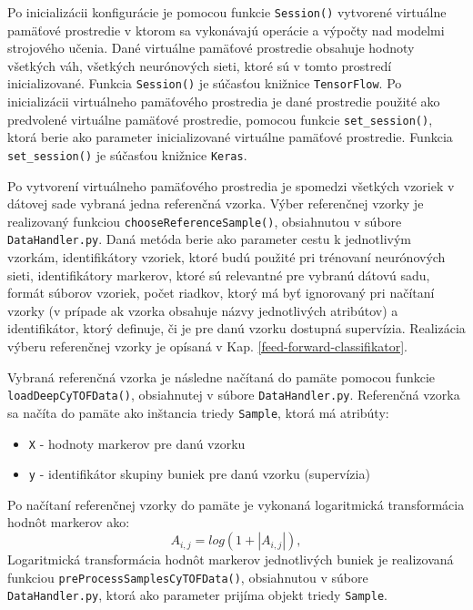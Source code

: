 Po inicializácii konfigurácie je pomocou funkcie \texttt{Session()} vytvorené virtuálne pamäťové prostredie v ktorom sa vykonávajú operácie a výpočty nad modelmi strojového učenia. Dané virtuálne pamäťové prostredie obsahuje hodnoty všetkých váh, všetkých neurónových sieti, ktoré sú v tomto prostredí inicializované. Funkcia \texttt{Session()} je súčasťou knižnice \texttt{TensorFlow}. Po inicializácii virtuálneho pamäťového prostredia je dané prostredie použité ako predvolené virtuálne pamäťové prostredie, pomocou funkcie \texttt{set_session()}, ktorá berie ako parameter inicializované virtuálne pamäťové prostredie. Funkcia \texttt{set_session()} je súčasťou knižnice \texttt{Keras}.

Po vytvorení virtuálneho pamäťového prostredia je spomedzi všetkých vzoriek v dátovej sade vybraná jedna referenčná vzorka. Výber referenčnej vzorky je realizovaný funkciou \texttt{chooseReferenceSample()}, obsiahnutou v súbore \texttt{DataHandler.py}. Daná metóda berie ako parameter cestu k jednotlivým vzorkám, identifikátory vzoriek, ktoré budú použité pri trénovaní neurónových sieti, identifikátory markerov, ktoré sú relevantné pre vybranú dátovú sadu, formát súborov vzoriek, počet riadkov, ktorý má byť ignorovaný pri načítaní vzorky (v prípade ak vzorka obsahuje názvy jednotlivých atribútov) a identifikátor, ktorý definuje, či je pre danú vzorku dostupná supervízia. Realizácia výberu referenčnej vzorky je opísaná v Kap. \ref{feed-forward-classifikator}.

\begin{sloppypar}
Vybraná referenčná vzorka je následne načítaná do pamäte pomocou funkcie \texttt{loadDeepCyTOFData()}, obsiahnutej v súbore \texttt{DataHandler.py}. Referenčná vzorka sa načíta do pamäte ako inštancia triedy \texttt{Sample}, ktorá má atribúty:
\begin{itemize}
    \item \texttt{X} - hodnoty markerov pre danú vzorku
    \item \texttt{y} - identifikátor skupiny buniek pre danú vzorku (supervízia)
\end{itemize}

Po načítaní referenčnej vzorky do pamäte je vykonaná logaritmická transformácia hodnôt markerov ako:
\begin{equation}
\label{log_transf}
    A_{i,j} = log(1+|A_{i,j}|),
\end{equation}
Logaritmická transformácia hodnôt markerov jednotlivých buniek je realizovaná funkciou \texttt{preProcessSamplesCyTOFData()}, obsiahnutou v súbore \texttt{DataHandler.py}, ktorá ako parameter prijíma objekt triedy \texttt{Sample}. 
\end{sloppypar}

